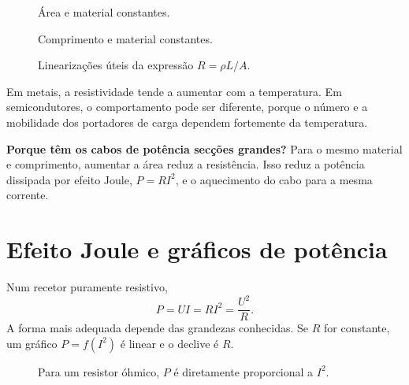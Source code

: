 \documentclass[11pt,a4paper,oneside]{book}
\begin{document}
\begin{figure}[H]
\centering
\begin{minipage}{0.48\textwidth}
\centering
{}
\small Área e material constantes.
\end{minipage}\hfill
\begin{minipage}{0.48\textwidth}
\centering
{}
\small Comprimento e material constantes.
\end{minipage}
\caption{Linearizações úteis da expressão $R=\rho L/A$.}
\end{figure}

Em metais, a resistividade tende a aumentar com a temperatura. Em semicondutores, o comportamento pode ser diferente, porque o número e a mobilidade dos portadores de carga dependem fortemente da temperatura.

\begin{mundo}
\textbf{Porque têm os cabos de potência secções grandes?} Para o mesmo material e comprimento, aumentar a área reduz a resistência. Isso reduz a potência dissipada por efeito Joule, $P=RI^2$, e o aquecimento do cabo para a mesma corrente.
\end{mundo}

\section{Efeito Joule e gráficos de potência}
Num recetor puramente resistivo,
\[
P=UI=RI^2=\frac{U^2}{R}.
\]
A forma mais adequada depende das grandezas conhecidas. Se $R$ for constante, um gráfico $P=f(I^2)$ é linear e o declive é $R$.

\begin{figure}[H]
\centering
{}
\caption{Para um resistor óhmico, $P$ é diretamente proporcional a $I^2$.}
\end{figure}
\end{document}
